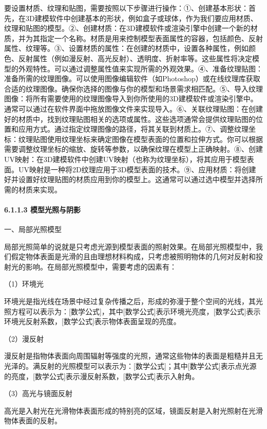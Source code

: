 要设置材质、纹理和贴图，需要按照以下步骤进行操作：①、创建基本形状：首先，在3D建模软件中创建基本的形状，例如盒子或球体，作为我们要应用材质、纹理和贴图的模型。②、创建材质：在3D建模软件或渲染引擎中创建一个新的材质，并为其指定一个名称。材质是用来控制模型表面属性的容器，包括颜色、反射属性、纹理等。③、设置材质的属性：在创建的材质中，设置各种属性，例如颜色、反射属性（例如漫反射、高光反射）、透明度、折射率等。这些属性将决定模型的外观特性。可以通过调整属性值来实现所需的外观效果。④、准备纹理贴图：准备所需的纹理图像。可以使用图像编辑软件（如Photoshop）或在线纹理库获取合适的纹理图像。确保你选择的图像与你的模型和场景需求相匹配。⑤、导入纹理图像：将所有需要使用的纹理图像导入到你所使用的3D建模软件或渲染引擎中。通常可以通过在软件界面中拖放图像文件来实现导入。⑥、关联纹理贴图：在创建好的材质中，找到纹理贴图相关的选项或属性。这些选项通常会提供纹理贴图的位置和应用方式。通过指定纹理图像的路径，将其关联到材质上。⑦、调整纹理坐标：纹理贴图使用纹理坐标来确定图像在模型表面的位置和拉伸方式。你可以根据需要调整纹理坐标的缩放、旋转等参数，以确保纹理在模型上正确映射。⑧、创建UV映射：在3D建模软件中创建UV映射（也称为纹理坐标），将其应用于模型表面。UV映射是一种将2D纹理应用于3D模型表面的技术。⑨、应用材质：将创建好并设置好纹理贴图的材质应用到你的模型上。这通常可以通过选中模型并选择所需的材质来实现。

\paragraph{6.1.1.3 模型光照与阴影}\label{ux6a21ux578bux5149ux7167ux4e0eux9634ux5f71}

一、局部光照模型

局部光照简单的说就是只考虑光源到模型表面的照射效果。在局部光照模型中，我们假定物体表面是光滑的且由理想材料构成，只考虑被照明物体的几何对反射和投射光的影响。在局部光照模型中，需要考虑的因素有：

（1）环境光

环境光是指光线在场景中经过复杂传播之后，形成的弥漫于整个空间的光线，其光照方程可以表示为：{[}数学公式{]}，其中{[}数学公式{]}表示环境光亮度，{[}数学公式{]}表示环境光反射系数，{[}数学公式{]}表示物体表面呈现的亮度。

（2）漫反射

漫反射是指物体表面向周围辐射等强度的光照，通常这些物体的表面是粗糙并且无光泽的。满反射的光照模型可以表示为：{[}数学公式{]}；其中{[}数学公式{]}表示点光源的亮度，{[}数学公式{]}表示漫反射系数，{[}数学公式{]}表示入射角。

（3）高光与镜面反射

高光是入射光在光滑物体表面形成的特别亮的区域，镜面反射是入射光照射在光滑物体表面的反射。

